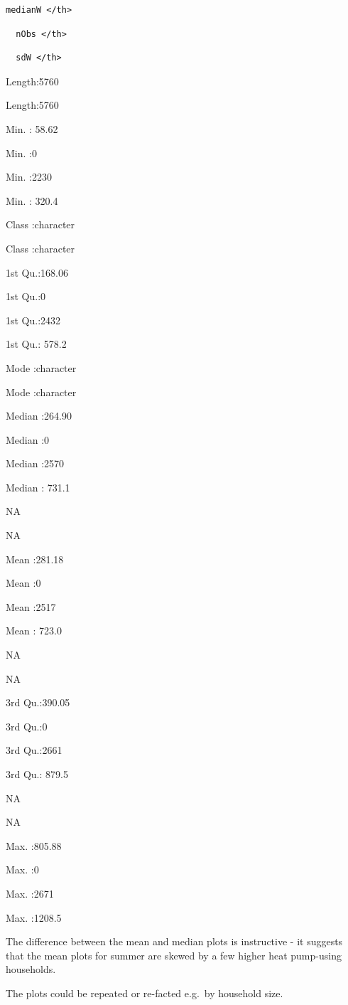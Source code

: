 \documentclass[]{article}
\begin{document}
\begin{verbatim}
medianW </th>
\end{verbatim}

\begin{verbatim}
  nObs </th>
\end{verbatim}

\begin{verbatim}
  sdW </th>
\end{verbatim}

Length:5760

Length:5760

Min. : 58.62

Min. :0

Min. :2230

Min. : 320.4

Class :character

Class :character

1st Qu.:168.06

1st Qu.:0

1st Qu.:2432

1st Qu.: 578.2

Mode :character

Mode :character

Median :264.90

Median :0

Median :2570

Median : 731.1

NA

NA

Mean :281.18

Mean :0

Mean :2517

Mean : 723.0

NA

NA

3rd Qu.:390.05

3rd Qu.:0

3rd Qu.:2661

3rd Qu.: 879.5

NA

NA

Max. :805.88

Max. :0

Max. :2671

Max. :1208.5

The difference between the mean and median plots is instructive - it
suggests that the mean plots for summer are skewed by a few higher heat
pump-using households.

The plots could be repeated or re-facted e.g.~by household size.
\end{document}
